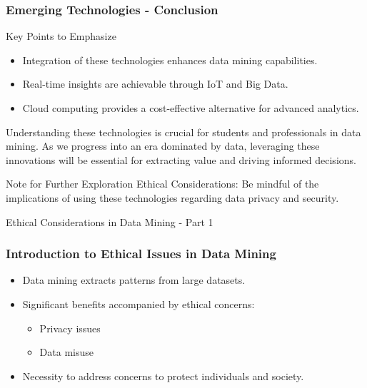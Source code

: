 \documentclass[aspectratio=169]{beamer}
\begin{document}
\begin{frame}[fragile]
    \frametitle{Emerging Technologies - Conclusion}
    \begin{block}{Key Points to Emphasize}
        \begin{itemize}
            \item Integration of these technologies enhances data mining capabilities.
            \item Real-time insights are achievable through IoT and Big Data.
            \item Cloud computing provides a cost-effective alternative for advanced analytics.
        \end{itemize}
    \end{block}
    
    Understanding these technologies is crucial for students and professionals in data mining. As we progress into an era dominated by data, leveraging these innovations will be essential for extracting value and driving informed decisions.
    
    \begin{block}{Note for Further Exploration}
        \small{Ethical Considerations: Be mindful of the implications of using these technologies regarding data privacy and security.}
    \end{block}
\end{frame}

\begin{frame}[fragile]{Ethical Considerations in Data Mining - Part 1}
    \frametitle{Introduction to Ethical Issues in Data Mining}
    \begin{itemize}
        \item Data mining extracts patterns from large datasets.
        \item Significant benefits accompanied by ethical concerns:
        \begin{itemize}
            \item Privacy issues
            \item Data misuse
        \end{itemize}
        \item Necessity to address concerns to protect individuals and society.
    \end{itemize}
\end{frame}
\end{document}
